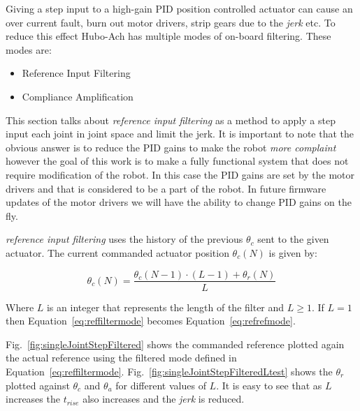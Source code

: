 Giving a step input to a high-gain PID position controlled actuator can cause an over current fault, burn out motor drivers, strip gears due to the \textit{jerk} etc.  
To reduce this effect Hubo-Ach has multiple modes of on-board filtering.
These modes are:
\begin{itemize}
\item Reference Input Filtering
\item Compliance Amplification 
\end{itemize}

This section talks about \textit{reference input filtering} as a method to apply a step input each joint in joint space and limit the jerk.
It is important to note that the obvious answer is to reduce the PID gains to make the robot \textit{more complaint} however the goal of this work is to make a fully functional system that does not require modification of the robot.
In this case the PID gains are set by the motor drivers and that is considered to be a part of the robot.
In future firmware updates of the motor drivers we will have the ability to change PID gains on the fly.

\textit{reference input filtering} uses the history of the previous $\theta_c$ sent to the given actuator.  The current commanded actuator position $\theta_c(N)$ is given by:

\begin{equation}\label{eq:reffiltermode}
\theta_c(N) = \frac{\theta_c(N-1)\cdot\left(L-1\right) + \theta_r(N)}{L}
\end{equation}

Where $L$ is an integer that represents the length of the filter and $L\geq1$.  
If $L=1$ then Equation~\ref{eq:reffiltermode} becomes Equation~\ref{eq:refrefmode}.





Fig.~\ref{fig:singleJointStepFiltered} shows the commanded reference plotted again the actual reference using the filtered mode defined in Equation~\ref{eq:reffiltermode}.
Fig.~\ref{fig:singleJointStepFilteredLtest} shows the $\theta_r$ plotted against $\theta_c$ and $\theta_a$ for different values of $L$.
It is easy to see that as $L$ increases the $t_{rise}$ also increases and the \textit{jerk} is reduced.


